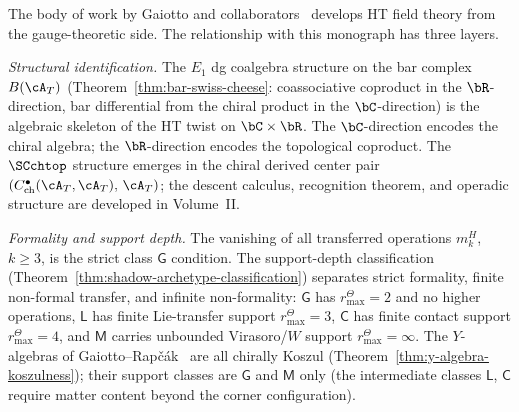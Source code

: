 \begin{remark}
\label{rem:gaiotto-programme-comparison}

The body of work by Gaiotto and
collaborators~\cite{gaiotto-rapchak,CostelloGaiotto2020,GKW25}
develops HT field theory from the gauge-theoretic side. The
relationship with this monograph has three layers.

\emph{Structural identification.}
The $E_1$ dg coalgebra structure on the bar complex
$B(\cA_T)$
(Theorem~\ref{thm:bar-swiss-cheese}: coassociative coproduct
in the $\bR$-direction, bar differential from the chiral product in
the $\bC$-direction) is the algebraic skeleton of the HT
twist on $\bC \times \bR$. The $\bC$-direction encodes the
chiral algebra; the $\bR$-direction encodes the topological
coproduct. The $\SCchtop$ structure emerges in the chiral derived center
pair $(C^\bullet_{\mathrm{ch}}(\cA_T,\cA_T),\, \cA_T)$; the descent calculus, recognition theorem, and
operadic structure are developed in
Volume~II\@.

\emph{Formality and support depth.}
The vanishing of all transferred operations
$m_k^H$, $k\geq 3$, is the strict class $\mathsf{G}$
condition. The support-depth classification
(Theorem~\ref{thm:shadow-archetype-classification})
separates strict formality, finite non-formal transfer, and
infinite non-formality:
$\mathsf{G}$ has \(r^\Theta_{\max}=2\) and no higher operations,
$\mathsf{L}$ has finite Lie-transfer support
\(r^\Theta_{\max}=3\),
$\mathsf{C}$ has finite contact support \(r^\Theta_{\max}=4\), and
$\mathsf{M}$ carries unbounded Virasoro/$W$ support
\(r^\Theta_{\max}=\infty\).
The $Y$-algebras of Gaiotto--Rap\v{c}\'ak~\cite{gaiotto-rapchak}
are all chirally Koszul
(Theorem~\ref{thm:y-algebra-koszulness}); their support
classes are $\mathsf{G}$ and $\mathsf{M}$ only (the
intermediate classes $\mathsf{L}$, $\mathsf{C}$ require
matter content beyond the corner configuration).


\end{remark}

